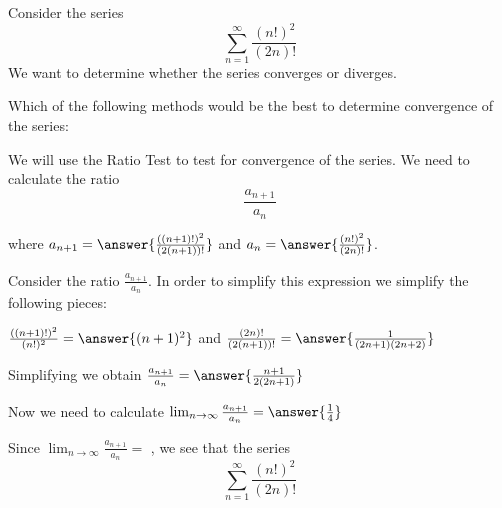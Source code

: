 \documentclass{ximera}
\author{Jason Miller}
\begin{document}
\begin{exercise}

Consider the series 
\[
\sum^{\infty}_{n=1} \frac{(n!)^2}{(2n)!}
\]
We want to determine whether the series converges or diverges. 


Which of the following methods would be the best to determine convergence of the series:

\begin{multipleChoice}
\end{multipleChoice}



\begin{exercise}

We will use the Ratio Test to test for convergence of the series. 
We need to calculate the ratio
\[
\frac{a_{n+1}}{a_n}
\]

where $a_{n+1}=\answer{ \frac{((n+1)!)^2 }{(2(n+1))!}}$ and $a_n=\answer{ \frac{(n!)^2}{(2n)!}}$. 

\begin{exercise}
Consider the ratio $\frac{a_{n+1}}{a_n}$. In order to simplify this expression we simplify the following pieces:

$ \frac{((n+1)!)^2}{(n!)^2}=\answer{(n+1)^2}$ and $\frac{ (2n)!}{(2(n+1))!}=\answer{\frac{1}{(2n+1)(2n+2)}}$

Simplifying we obtain $ \frac{a_{n+1}}{a_n} =\answer{  \frac{n+1}{2(2n+1)}}$




\begin{exercise}

Now we need to calculate $\lim_{n\to \infty} \frac{a_{n+1}}{a_n} =\answer{ \frac{1}{4} }$


\begin{exercise}

Since $\lim_{n \to \infty} \frac{a_{n+1}}{a_n}=$  ,
we see that the series
\[
\sum^{\infty}_{n=1} \frac{(n!)^2}{(2n)!}
\]
\begin{multipleChoice}
\end{multipleChoice}

\end{exercise}
\end{exercise}

\end{exercise}
\end{exercise}
\end{exercise}
\end{document}
